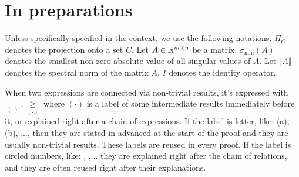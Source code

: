 \documentclass[12pt]{article}
\begin{document}
\section{In preparations}
    Unless specifically specified in the context, we use the following notations. 
    $\Pi_C$ denotes the projection onto a set $C$. 
    Let $A \in \mathbb R^{m \times n}$ be a matrix. 
    $\sigma_{\min}(A)$ denotes the smallest non-zero absolute value of all singular values of $A$. 
    Let $\Vert A\Vert$ denotes the spectral norm of the matrix $A$. 
    $I$ denotes the identity operator. 
    \par
    When two expressions are connected via non-trivial results, it's expressed with $\underset{(\cdot)}{=}, \underset{(\cdot)}{\ge}$ where $(\cdot)$ is a label of some intermediate results immediately before it, or explained right after a chain of expressions. 
    If the label is letter, like: (a), (b), ..., then they are stated in advanced at the start of the proof and they are usually non-trivial results. 
    These labels are reused in every proof. 
    If the label is circled numbers, like: , ,... they are explained right after the chain of relations, and they are often reused right after their explanations. 
\end{document}
